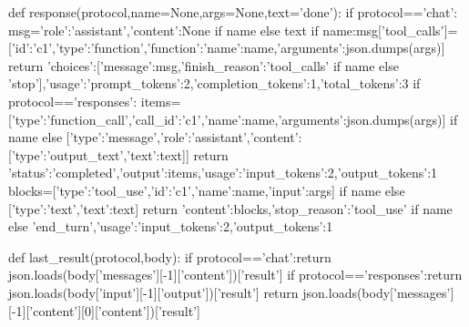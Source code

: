 def response(protocol,name=None,args=None,text='done'):
    if protocol=='chat':
        msg={'role':'assistant','content':None if name else text}
        if name:msg['tool_calls']=[{'id':'c1','type':'function','function':{'name':name,'arguments':json.dumps(args)}}]
        return {'choices':[{'message':msg,'finish_reason':'tool_calls' if name else 'stop'}],'usage':{'prompt_tokens':2,'completion_tokens':1,'total_tokens':3}}
    if protocol=='responses':
        items=[{'type':'function_call','call_id':'c1','name':name,'arguments':json.dumps(args)}] if name else [{'type':'message','role':'assistant','content':[{'type':'output_text','text':text}]}]
        return {'status':'completed','output':items,'usage':{'input_tokens':2,'output_tokens':1}}
    blocks=[{'type':'tool_use','id':'c1','name':name,'input':args}] if name else [{'type':'text','text':text}]
    return {'content':blocks,'stop_reason':'tool_use' if name else 'end_turn','usage':{'input_tokens':2,'output_tokens':1}}

def last_result(protocol,body):
    if protocol=='chat':return json.loads(body['messages'][-1]['content'])['result']
    if protocol=='responses':return json.loads(body['input'][-1]['output'])['result']
    return json.loads(body['messages'][-1]['content'][0]['content'])['result']

